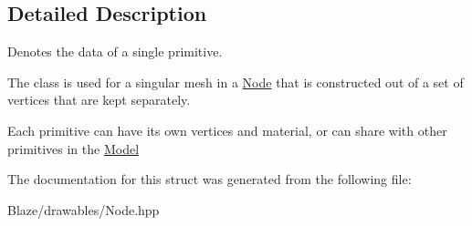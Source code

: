 \subsection{Detailed Description}
Denotes the data of a single primitive. 

The class is used for a singular mesh in a \hyperlink{structblaze_1_1Node}{Node} that is constructed out of a set of vertices that are kept separately.

Each primitive can have its own vertices and material, or can share with other primitives in the \hyperlink{classblaze_1_1Model}{Model} 

The documentation for this struct was generated from the following file\+:\begin{DoxyCompactItemize}
\item 
Blaze/drawables/Node.\+hpp\end{DoxyCompactItemize}
